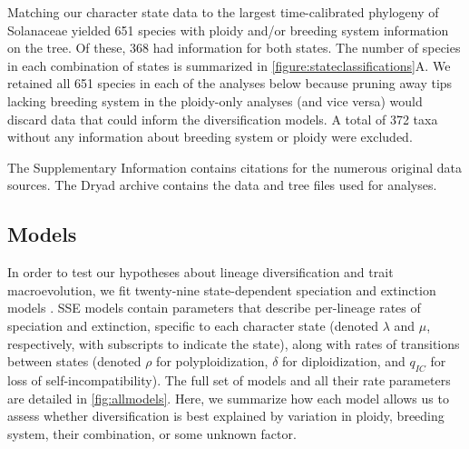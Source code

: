 Matching our character state data to the largest time-calibrated phylogeny of Solanaceae \citep{sarkinen_2013} yielded 651 species with ploidy and/or breeding system information on the tree.
Of these, 368 had information for both states.
The number of species in each combination of states is summarized in \cref{figure:stateclassifications}A.
We retained all 651 species in each of the analyses below because pruning away tips lacking breeding system in the ploidy-only analyses (and vice versa) would discard data that could inform the diversification models.
A total of 372 taxa without any information about breeding system or ploidy were excluded.

The Supplementary Information contains citations for the numerous original data sources. %
The Dryad archive contains the data and tree files used for analyses. %

\subsection{Models}

In order to test our hypotheses about lineage diversification and trait macroevolution, we fit twenty-nine state-dependent speciation and extinction models \citep[BiSSE, MuSSE, HiSSE;][]{maddison_2007, fitzjohn_2012, beaulieu_2016}.
SSE models contain parameters that describe per-lineage rates of speciation and extinction, specific to each character state (denoted $\lambda$ and $\mu$, respectively, with subscripts to indicate the state), along with rates of transitions between states (denoted $\rho$ for polyploidization, $\delta$ for diploidization, and $q_{IC}$ for loss of self-incompatibility).
The full set of models and all their rate parameters are detailed in \cref{fig:allmodels}.
Here, we summarize how each model allows us to assess whether diversification is best explained by variation in ploidy, breeding system, their combination, or some unknown factor.

